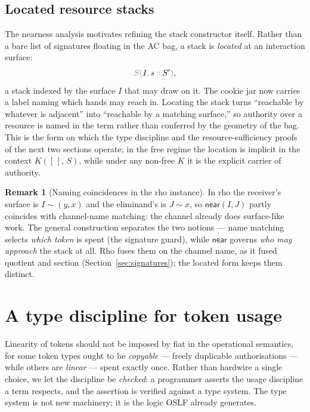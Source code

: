 \documentclass[11pt]{article}
\theoremstyle{definition}
\newtheorem{remark}[definition]{Remark}
\theoremstyle{plain}
\newcommand{\dec}[1]{\textcolor{costgray}{#1}}   %
\newcommand{\near}{\mathsf{near}}
\newcommand{\lstk}[2]{\dec{S(}{#1}\dec{,}\,#2\dec{)}}  %
\newcommand{\Kctx}[1]{K([\,],\, #1)}
\newcommand{\cons}{\mathbin{\dec{\dblcolon}}}  %
\begin{document}
\subsection{Located resource stacks}

The nearness analysis motivates refining the stack constructor itself.
Rather than a bare list of signatures floating in the AC bag, a stack is
\emph{located} at an interaction surface:
\[
  \lstk{I}{s \cons S'},
\]
a stack indexed by the surface $I$ that may draw on it. The cookie jar now
carries a label naming which hands may reach in. Locating the stack turns
``reachable by whatever is adjacent'' into ``reachable by a matching
surface,'' so authority over a resource is named in the term rather than
conferred by the geometry of the bag. This is the form on which the type
discipline and the resource-sufficiency proofs of the next two sections
operate; in the free regime the location is implicit in the context
$\Kctx{S}$, while under any non-free $K$ it is the explicit carrier of
authority.

\begin{remark}[Naming coincidences in the rho instance]
In rho the receiver's surface is $I \sim (y,x)$ and the eliminand's is
$J \sim x$, so $\near(I,J)$ partly coincides with channel-name matching:
the channel already does surface-like work. The general construction
separates the two notions --- name matching selects \emph{which token} is
spent (the signature guard), while $\near$ governs \emph{who may approach}
the stack at all. Rho fuses them on the channel name, as it fused quotient
and section (Section~\ref{sec:signatures}); the located form keeps them
distinct.
\end{remark}

\section{A type discipline for token usage}
\label{sec:types}

Linearity of tokens should not be imposed by fiat in the operational
semantics, for some token types ought to be \emph{copyable} --- freely
duplicable authorisations --- while others are \emph{linear} --- spent
exactly once. Rather than hardwire a single choice, we let the discipline
be \emph{checked}: a programmer asserts the usage discipline a term
respects, and the assertion is verified against a type system. The type
system is not new machinery; it is the logic OSLF already generates.
\end{document}
